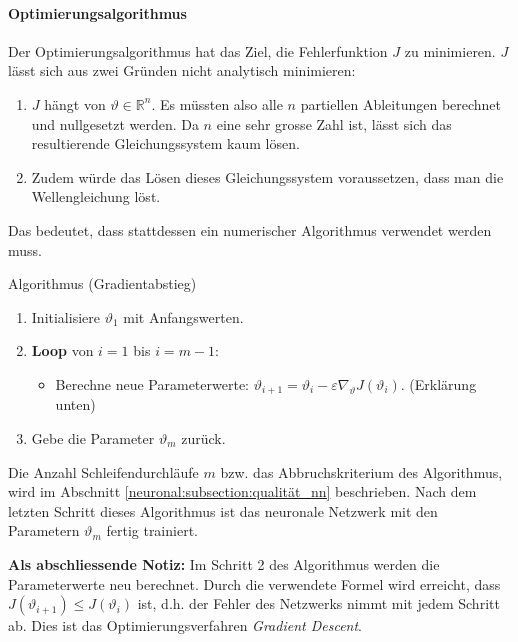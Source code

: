 \paragraph{Optimierungsalgorithmus}

Der Optimierungsalgorithmus hat das Ziel, die Fehlerfunktion \( J \) zu minimieren.
\( J \) lässt sich aus zwei Gründen nicht analytisch minimieren:
\begin{enumerate}
    \item \( J \) hängt von \( \vartheta \in \mathbb{R}^n \). 
    Es müssten also alle \( n \) partiellen Ableitungen berechnet und nullgesetzt werden. 
    Da \( n \) eine sehr grosse Zahl ist, lässt sich das resultierende Gleichungssystem kaum lösen.
    \item Zudem würde das Lösen dieses Gleichungssystem voraussetzen, dass man die Wellengleichung löst.
\end{enumerate}
Das bedeutet, dass stattdessen ein numerischer Algorithmus verwendet werden muss.

\begin{aufgabe}
    Algorithmus (Gradientabstieg)
    \begin{enumerate}
        \item Initialisiere \( \vartheta_1 \) mit Anfangswerten.
        \item \textbf{Loop} von \( i = 1 \) bis \( i = m - 1 \):
        \begin{itemize}
            \item Berechne neue Parameterwerte: \( \vartheta_{i+1} = \vartheta_i - \varepsilon \nabla_\vartheta J\left(\vartheta_i\right) \). (Erklärung unten)
        \end{itemize}
        \item Gebe die Parameter \( \vartheta_m \) zurück.
    \end{enumerate}
\end{aufgabe}

Die Anzahl Schleifendurchläufe \( m \) bzw. das Abbruchskriterium des Algorithmus, wird im Abschnitt \ref{neuronal:subsection:qualität_nn} beschrieben.
Nach dem letzten Schritt dieses Algorithmus ist das neuronale Netzwerk mit den Parametern \( \vartheta_m \) fertig trainiert.

\textbf{Als abschliessende Notiz:} Im Schritt 2 des Algorithmus werden die Parameterwerte neu berechnet.
Durch die verwendete Formel wird erreicht, dass \( J(\vartheta_{i+1}) \leq J(\vartheta_i) \) ist, d.h. der Fehler des Netzwerks nimmt mit jedem Schritt ab.
Dies ist das Optimierungsverfahren \emph{Gradient Descent}.

